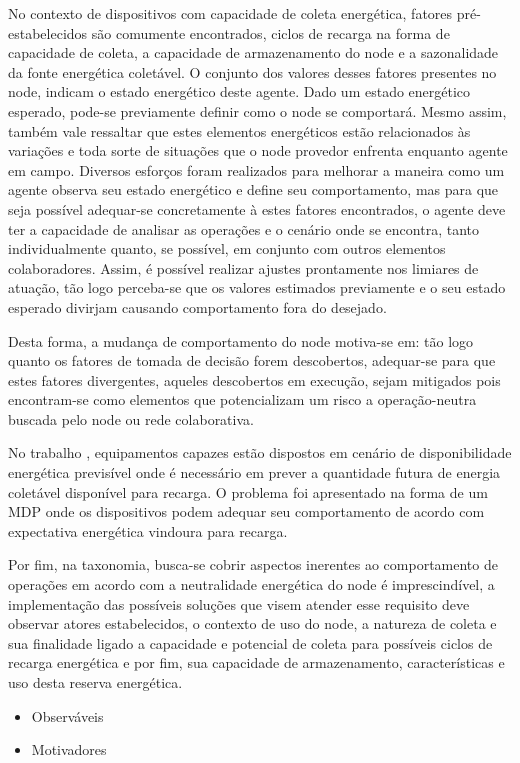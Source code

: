 No contexto de dispositivos com capacidade de coleta energética, fatores pré-estabelecidos são comumente encontrados, ciclos de recarga na forma de capacidade de coleta, a capacidade de armazenamento do node e a sazonalidade da fonte energética coletável. O conjunto dos valores  desses fatores presentes no node, indicam o estado energético deste agente. Dado um estado energético esperado, pode-se previamente definir como o node se comportará. Mesmo assim, também vale ressaltar que estes elementos energéticos estão relacionados às variações e toda sorte de situações que o node provedor enfrenta enquanto agente em campo. Diversos esforços foram realizados para melhorar a maneira como um agente observa seu estado energético e define seu comportamento, mas para que seja possível adequar-se concretamente à estes fatores encontrados, o agente deve ter a capacidade de analisar as operações e o cenário onde se encontra, tanto individualmente quanto, se possível, em conjunto com outros elementos colaboradores. Assim, é possível realizar ajustes prontamente nos limiares de atuação, tão logo perceba-se que os valores estimados previamente e o seu estado esperado divirjam causando comportamento fora do desejado.

Desta forma, a mudança de comportamento do node motiva-se em: tão logo quanto os fatores de tomada de decisão forem descobertos, adequar-se para que estes fatores divergentes, aqueles descobertos em execução, sejam mitigados pois encontram-se como elementos que potencializam um risco a operação-neutra buscada pelo node ou rede colaborativa. 

No trabalho \cite{zhang_toward_2018}, equipamentos capazes estão dispostos em cenário de disponibilidade energética previsível onde é necessário em prever a quantidade futura de energia coletável disponível para recarga. O problema foi apresentado na forma de um \ac{MDP} onde os dispositivos podem adequar seu comportamento de acordo com expectativa energética vindoura para recarga.  

Por fim, na taxonomia, busca-se cobrir aspectos inerentes ao comportamento de operações em acordo com a neutralidade energética do node é imprescindível, a implementação das possíveis soluções que visem atender esse requisito deve observar atores estabelecidos, o contexto de uso do node, a natureza de coleta e sua finalidade ligado a capacidade e potencial de coleta para possíveis ciclos de recarga energética e por fim, sua capacidade de armazenamento, características e uso desta reserva energética.


\begin{itemize}
\item Observáveis
\item Motivadores
\end{itemize}







